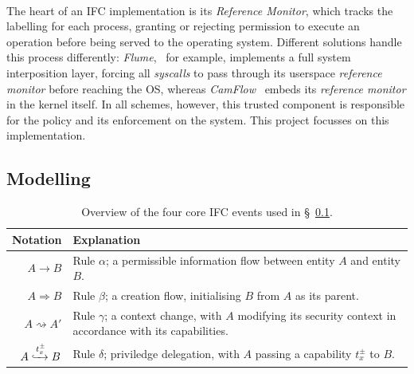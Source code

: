 \paragraph{} The heart of an IFC implementation is its \textit{Reference Monitor}, which tracks the labelling for each process, granting or rejecting permission to execute an operation before being served to the operating system. Different solutions handle this process differently: \textit{Flume},~\cite{flume} for example, implements a full system interposition layer, forcing all \textit{syscalls} to pass through its userspace \textit{reference monitor} before reaching the OS, whereas \textit{CamFlow}~\cite{camflow} embeds its \textit{reference monitor} in the kernel itself. In all schemes, however, this trusted component is responsible for the policy and its enforcement on the system. This project focusses on this implementation.


\subsection{Modelling}
\label{sec:ifc-modelling}

\begin{table}
    \centering
    \newcommand\tableTop{\rule{0pt}{3ex}}
    \newcommand\tableMid{\rule{0pt}{3ex}}
    \newcommand\tableBottom{\rule[-2ex]{0pt}{0pt}}
    \begin{tabular}{r p{10cm}} 
        \hline
        Notation & Explanation \\ [0.1ex] 
        \hline
            \tableTop{$A \rightarrow B$} & \tableTop{Rule $\alpha$; a permissible information flow between entity $A$ and entity $B$.} \\
            
            $A \Rightarrow B$ & \tableMid{Rule $\beta$; a creation flow, initialising $B$ from $A$ as its parent.} \\

            $A \rightsquigarrow A'$ & \tableMid{Rule $\gamma$; a context change, with $A$ modifying its security context in accordance with its capabilities.} \\
            
            $A \xhookrightarrow[]{t^{\pm}_{x}} B$ & \tableMid{Rule $\delta$; priviledge delegation, with $A$ passing a capability $t_{x}^{\pm}$ to $B$.} \tableBottom \\
    \end{tabular}
    \caption{Overview of the four core IFC events used in §~\ref{sec:ifc-modelling}.}
    \label{table:ifc-notation}
\end{table}


